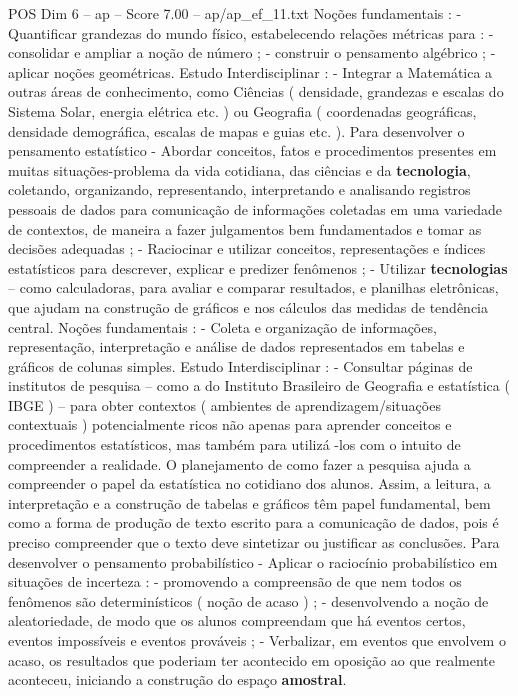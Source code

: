 \begin{textsample}{POS Dim 6 – ap – Score 7.00 – ap/ap\_ef\_11.txt}
Noções fundamentais : - Quantificar grandezas do mundo físico, estabelecendo relações métricas para : - consolidar e ampliar a noção de número ; - construir o pensamento algébrico ; - aplicar noções geométricas.
Estudo Interdisciplinar : - Integrar a Matemática a outras áreas de conhecimento, como Ciências ( densidade, grandezas e escalas do Sistema Solar, energia elétrica etc. ) ou Geografia ( coordenadas geográficas, densidade demográfica, escalas de mapas e guias etc. ).
Para desenvolver o pensamento estatístico - Abordar conceitos, fatos e procedimentos presentes em muitas situações-problema da vida cotidiana, das ciências e da \textbf{tecnologia}, coletando, organizando, representando, interpretando e analisando registros pessoais de dados para comunicação de informações coletadas em uma variedade de contextos, de maneira a fazer julgamentos bem fundamentados e tomar as decisões adequadas ; - Raciocinar e utilizar conceitos, representações e índices estatísticos para descrever, explicar e predizer fenômenos ; - Utilizar \textbf{tecnologias} – como calculadoras, para avaliar e comparar resultados, e planilhas eletrônicas, que ajudam na construção de gráficos e nos cálculos das medidas de tendência central.
Noções fundamentais : - Coleta e organização de informações, representação, interpretação e análise de dados representados em tabelas e gráficos de colunas simples.
Estudo Interdisciplinar : - Consultar páginas de institutos de pesquisa – como a do Instituto Brasileiro de Geografia e estatística ( IBGE ) – para obter contextos ( ambientes de aprendizagem/situações contextuais ) potencialmente ricos não apenas para aprender conceitos e procedimentos estatísticos, mas também para utilizá -los com o intuito de compreender a realidade.
O planejamento de como fazer a pesquisa ajuda a compreender o papel da estatística no cotidiano dos alunos.
Assim, a leitura, a interpretação e a construção de tabelas e gráficos têm papel fundamental, bem como a forma de produção de texto escrito para a comunicação de dados, pois é preciso compreender que o texto deve sintetizar ou justificar as conclusões.
Para desenvolver o pensamento probabilístico - Aplicar o raciocínio probabilístico em situações de incerteza : - promovendo a compreensão de que nem todos os fenômenos são determinísticos ( noção de acaso ) ; - desenvolvendo a noção de aleatoriedade, de modo que os alunos compreendam que há eventos certos, eventos impossíveis e eventos prováveis ; - Verbalizar, em eventos que envolvem o acaso, os resultados que poderiam ter acontecido em oposição ao que realmente aconteceu, iniciando a construção do espaço \textbf{amostral}.

\end{textsample}
